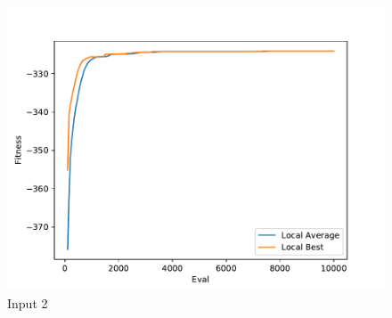 \documentclass{standalone}
\begin{document}
\begin{figure}[!htb]
	\caption{Input 2}
	\label{fig:graph_2051}
	\includegraphics[width=\textwidth]{../graphs/graphs/2051.pdf}
\end{figure}
\end{document}
